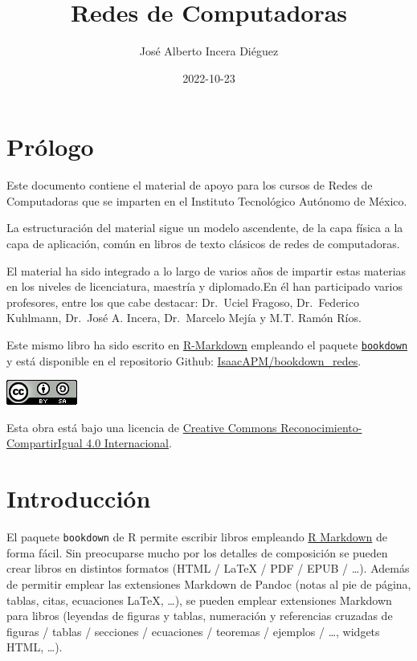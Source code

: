 \documentclass[
]{book}
\title{Redes de Computadoras}
\author{José Alberto Incera Diéguez}
\date{2022-10-23}
\theoremstyle{definition}
\theoremstyle{definition}
\theoremstyle{definition}
\theoremstyle{definition}
\theoremstyle{remark}
\begin{document}
\maketitle

{
\setcounter{tocdepth}{1}
\tableofcontents
}
\hypertarget{pruxf3logo}{%
\chapter*{Prólogo}\label{pruxf3logo}}

Este documento contiene el material de apoyo para los cursos de Redes de Computadoras que se imparten en el Instituto Tecnológico Autónomo de México.

La estructuración del material sigue un modelo ascendente, de la capa física a la capa de aplicación, común en libros de texto clásicos de redes de computadoras.

El material ha sido integrado a lo largo de varios años de impartir estas materias en los niveles de licenciatura, maestría y diplomado.En él han participado varios profesores, entre los que cabe destacar: Dr.~Uciel Fragoso, Dr.~Federico Kuhlmann, Dr.~José A. Incera, Dr.~Marcelo Mejía y M.T. Ramón Ríos.

Este mismo libro ha sido escrito en \href{http://rmarkdown.rstudio.com}{R-Markdown} empleando el paquete \href{https://bookdown.org/yihui/bookdown/}{\texttt{bookdown}} y está disponible en el repositorio Github: \href{https://github.com/IsaacAPM/bookdown_redes}{IsaacAPM/bookdown\_redes}.

\begin{flushleft}\includegraphics{images/by-sa-88x31} \end{flushleft}

Esta obra está bajo una licencia de \href{https://creativecommons.org/licenses/by-sa/4.0/deed.es}{Creative Commons Reconocimiento-CompartirIgual 4.0 Internacional}.

\hypertarget{intro}{%
\chapter{Introducción}\label{intro}}

El paquete \texttt{bookdown} \citep{R-bookdown} de R \citep{R-base} permite escribir libros empleando
\href{http://rmarkdown.rstudio.com}{R Markdown} de forma fácil.
Sin preocuparse mucho por los detalles de composición
se pueden crear libros en distintos formatos (HTML / LaTeX / PDF / EPUB / \ldots).
Además de permitir emplear las extensiones Markdown de Pandoc
(notas al pie de página, tablas, citas, ecuaciones LaTeX, \ldots),
se pueden emplear extensiones Markdown para libros
(leyendas de figuras y tablas, numeración y referencias cruzadas de figuras / tablas / secciones / ecuaciones / teoremas / ejemplos / \ldots, widgets HTML, \ldots).
\end{document}

